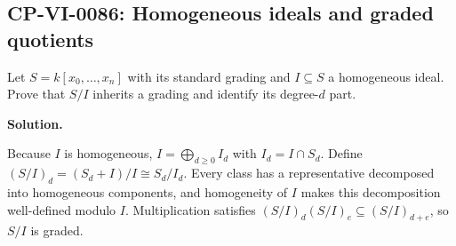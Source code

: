 
\subsection*{CP-VI-0086: Homogeneous ideals and graded quotients}

Let $S=k[x_0,\dots,x_n]$ with its standard grading and $I\subseteq S$ a homogeneous ideal. Prove that $S/I$ inherits a grading and identify its degree-$d$ part.

\medskip
\noindent\textbf{Solution.}

Because $I$ is homogeneous, $I=\bigoplus_{d\ge0}I_d$ with $I_d=I\cap S_d$. Define $(S/I)_d=(S_d+I)/I\cong S_d/I_d$. Every class has a representative decomposed into homogeneous components, and homogeneity of $I$ makes this decomposition well-defined modulo $I$. Multiplication satisfies $(S/I)_d(S/I)_e\subseteq(S/I)_{d+e}$, so $S/I$ is graded.
